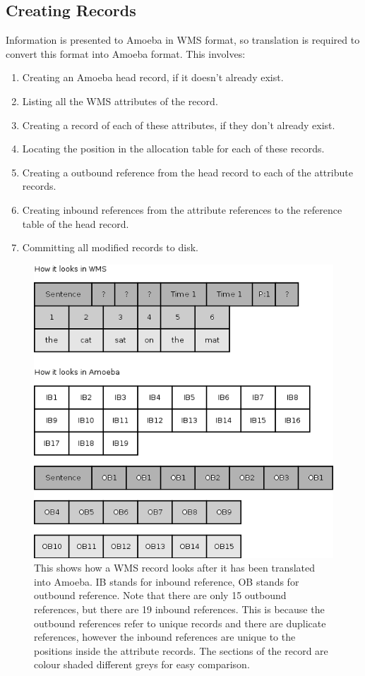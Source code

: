 \documentclass[11pt]{article}
\begin{document}
\subsection{Creating Records}
Information is presented to Amoeba in WMS format, so translation is required to convert this format into Amoeba format. This involves:
\begin{enumerate}
\item Creating an Amoeba head record, if it doesn't already exist.
\item Listing all the WMS attributes of the record.
\item Creating a record of each of these attributes, if they don't already exist.
\item Locating the position in the allocation table for each of these records.
\item Creating a outbound reference from the head record to each of the attribute records.
\item Creating inbound references from the attribute references to the reference table of the head record.
\item Committing all modified records to disk.
\end{enumerate} 
\newpage
\noindent
\begin{figure}[ht]
\centering
\includegraphics[scale=0.6]{WMS2Amoeba.png}
\caption{This shows how a WMS record looks after it has been translated into Amoeba. IB stands for inbound reference, OB stands for outbound reference. Note that there are only 15 outbound references, but there are 19 inbound references. This is because the outbound references refer to unique records and there are duplicate references, however the inbound references are unique to the positions inside the attribute records. The sections of the record are colour shaded different greys for easy comparison.}
\end{figure}
\end{document}
